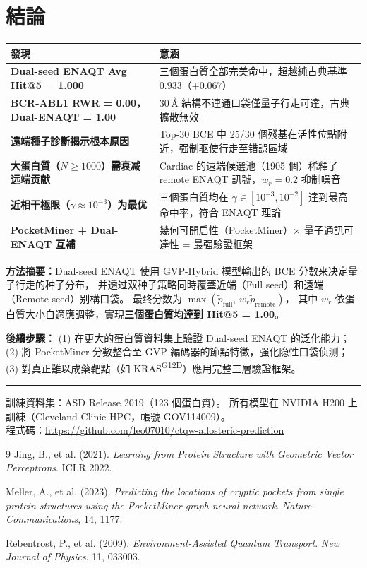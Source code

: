 \documentclass[11pt, a4paper]{article}
\begin{document}
\section{結論}

\begin{table}[H]
\centering
\begin{tabular}{>{\bfseries}p{5.5cm}p{7.5cm}}
\toprule
發現 & 意涵 \\
\midrule
\textcolor{cGreen}{Dual-seed ENAQT Avg Hit@5 = \textbf{1.000}}
  & 三個蛋白質全部完美命中，超越純古典基準 0.933（$+0.067$） \\
BCR-ABL1 RWR = 0.00，Dual-ENAQT = 1.00
  & 30\,\AA{} 結構不連通口袋僅量子行走可達，古典擴散無效 \\
遠端種子診斷揭示根本原因
  & Top-30 BCE 中 25/30 個殘基在活性位點附近，强制驱使行走至错誤區域 \\
大蛋白質（$N\geq1000$）需衰减远端贡献
  & Cardiac 的遠端候選池（1905 個）稀釋了 remote ENAQT 訊號，$w_r=0.2$ 抑制噪音 \\
近相干極限（$\gamma\approx10^{-3}$）为最优
  & 三個蛋白質均在 $\gamma\in[10^{-3},10^{-2}]$ 達到最高命中率，符合 ENAQT 理論 \\
PocketMiner + Dual-ENAQT 互補
  & 幾何可開启性（PocketMiner）$\times$ 量子通訊可達性 = 最强驗證框架 \\
\bottomrule
\end{tabular}
\end{table}

\textbf{方法摘要：}Dual-seed ENAQT 使用 GVP-Hybrid 模型輸出的 BCE 分數来决定量子行走的种子分布，
并透过双种子策略同時覆蓋近端（Full seed）和遠端（Remote seed）别構口袋。
最终分数为 $\max(\tilde{p}_{\text{full}},\, w_r\tilde{p}_{\text{remote}})$，
其中 $w_r$ 依蛋白質大小自適應調整，實現\textbf{三個蛋白質均達到 Hit@5 = 1.00}。

\textbf{後續步驟：}
(1) 在更大的蛋白質資料集上驗證 Dual-seed ENAQT 的泛化能力；
(2) 將 PocketMiner 分數整合至 GVP 編碼器的節點特徵，强化隐性口袋侦测；
(3) 對真正難以成藥靶點（如 KRAS\textsuperscript{G12D}）應用完整三層驗證框架。

\vspace{2em}
\hrule
\vspace{0.5em}
\small
訓練資料集：ASD Release 2019（123 個蛋白質）。
所有模型在 NVIDIA H200 上訓練（Cleveland Clinic HPC，帳號 GOV114009）。\\
程式碼：\url{https://github.com/leo07010/ctqw-allosteric-prediction}

\begin{thebibliography}{9}
  Jing, B., et al. (2021).
  \textit{Learning from Protein Structure with Geometric Vector Perceptrons}.
  ICLR 2022.

  Meller, A., et al. (2023).
  \textit{Predicting the locations of cryptic pockets from single protein structures
  using the PocketMiner graph neural network}.
  \textit{Nature Communications}, 14, 1177.

  Rebentrost, P., et al. (2009).
  \textit{Environment-Assisted Quantum Transport}.
  \textit{New Journal of Physics}, 11, 033003.
\end{thebibliography}
\end{document}

